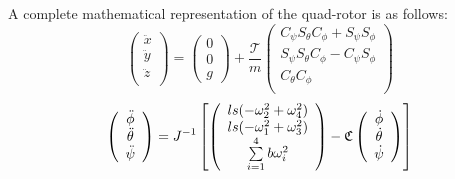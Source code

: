 A complete mathematical representation of the quad-rotor is as follows:\\
\begin{equation}
    \label{lineareq}
    \left(
        \begin{array}{c}
           \ddot{x}\\
           \ddot{y}\\
           \ddot{z}\\
        \end{array}
    \right)
    = \left(
       \begin{array}{c}
        0\\
        0\\
        g
      \end{array}
    \right)
    +\frac{\mathcal{T}}{m}
     \left(
        \begin{array}{c}
             C_{\psi}S_{\theta}C_{\phi} + S_{\psi}S_{\phi} \\
             S_{\psi}S_{\theta}C_{\phi} - C_{\psi}S_{\phi} \\
             C_{\theta} C_{\phi} \\
        \end{array}
    \right)
\end{equation}
\begin{equation}
    \label{angulareq}
    \left(
        \begin{array}{c}
           \ddot{\phi}\\
           \ddot{\theta}\\
           \ddot{\psi}\\
        \end{array}
    \right) = J^{-1}
    \left[ \left(
        \begin{array}{c}
            l s (-\omega_2^2 + \omega_4^2)\\
            l s (-\omega_1^2 + \omega_3^2)\\
            \sum \limits_{i=1}^4 b \omega_i^2\\
        \end{array}
    \right) -
    \cc
    \left(
        \begin{array}{c}
           \dot{\phi}\\
           \dot{\theta}\\
           \dot{\psi}\\
        \end{array}
    \right)
    \right]
\end{equation}


